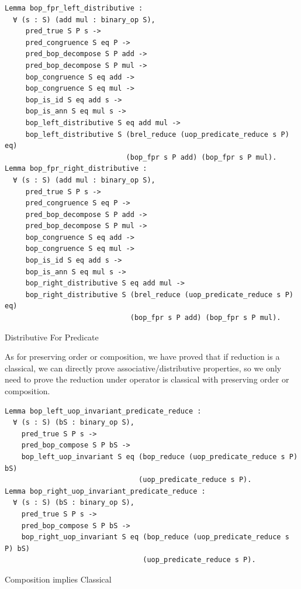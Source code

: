 \documentclass[a4paper,12pt,twoside,openright]{report}
\begin{document}
\begin{listing}[H]
\begin{verbatim}
Lemma bop_fpr_left_distributive :
  ∀ (s : S) (add mul : binary_op S),
     pred_true S P s -> 
     pred_congruence S eq P ->
     pred_bop_decompose S P add ->
     pred_bop_decompose S P mul ->          
     bop_congruence S eq add ->     
     bop_congruence S eq mul -> 
     bop_is_id S eq add s ->     
     bop_is_ann S eq mul s ->
     bop_left_distributive S eq add mul ->
     bop_left_distributive S (brel_reduce (uop_predicate_reduce s P) eq) 
                             (bop_fpr s P add) (bop_fpr s P mul).
Lemma bop_fpr_right_distributive :
  ∀ (s : S) (add mul : binary_op S),
     pred_true S P s -> 
     pred_congruence S eq P ->
     pred_bop_decompose S P add ->
     pred_bop_decompose S P mul ->          
     bop_congruence S eq add ->     
     bop_congruence S eq mul -> 
     bop_is_id S eq add s ->     
     bop_is_ann S eq mul s ->
     bop_right_distributive S eq add mul ->
     bop_right_distributive S (brel_reduce (uop_predicate_reduce s P) eq) 
                              (bop_fpr s P add) (bop_fpr s P mul).
\end{verbatim}
\caption{Distributive For Predicate} 
\label{coq:proof:predicate_distributive}
\end{listing}
As for preserving order or composition, we have proved that if reduction is a classical, we can directly prove associative/distributive properties, so we only need to prove the reduction under operator is classical with preserving order or composition.
\begin{listing}[H]
\begin{verbatim}
Lemma bop_left_uop_invariant_predicate_reduce :
  ∀ (s : S) (bS : binary_op S),
    pred_true S P s -> 
    pred_bop_compose S P bS ->
    bop_left_uop_invariant S eq (bop_reduce (uop_predicate_reduce s P) bS) 
                                (uop_predicate_reduce s P).
Lemma bop_right_uop_invariant_predicate_reduce :
  ∀ (s : S) (bS : binary_op S),
    pred_true S P s -> 
    pred_bop_compose S P bS ->    
    bop_right_uop_invariant S eq (bop_reduce (uop_predicate_reduce s P) bS) 
                                 (uop_predicate_reduce s P).
\end{verbatim}
\caption{Composition implies Classical} 
\label{coq:proof:composition_classic}
\end{listing}
\end{document}
